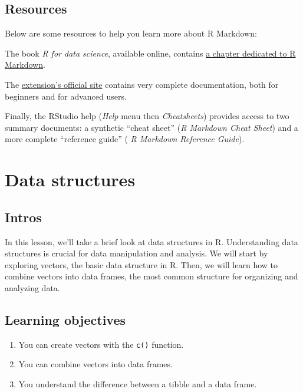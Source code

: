 \documentclass[
  letterpaper,
  DIV=11,
  numbers=noendperiod]{scrreprt}
\begin{document}
\hypertarget{resources}{%
\section{Resources}\label{resources}}

Below are some resources to help you learn more about R Markdown:

The book \emph{R for data science}, available online, contains
\href{http://r4ds.had.co.nz/r-markdown.html}{a chapter dedicated to R
Markdown}.

The \href{http://rmarkdown.rstudio.com/}{extension's official site}
contains very complete documentation, both for beginners and for
advanced users.

Finally, the RStudio help (\emph{Help} menu then \emph{Cheatsheets})
provides access to two summary documents: a synthetic ``cheat sheet''
(\emph{R Markdown Cheat Sheet}) and a more complete ``reference guide''
( \emph{R Markdown Reference Guide}).


\hypertarget{data-structures}{%
\chapter{Data structures}\label{data-structures}}

\hypertarget{intros}{%
\section{Intros}\label{intros}}

In this lesson, we'll take a brief look at data structures in R.
Understanding data structures is crucial for data manipulation and
analysis. We will start by exploring vectors, the basic data structure
in R. Then, we will learn how to combine vectors into data frames, the
most common structure for organizing and analyzing data.

\hypertarget{learning-objectives-5}{%
\section{Learning objectives}\label{learning-objectives-5}}

\begin{enumerate}
\def\labelenumi{\arabic{enumi}.}
\item
  You can create vectors with the \texttt{c()} function.
\item
  You can combine vectors into data frames.
\item
  You understand the difference between a tibble and a data frame.
\end{enumerate}
\end{document}
